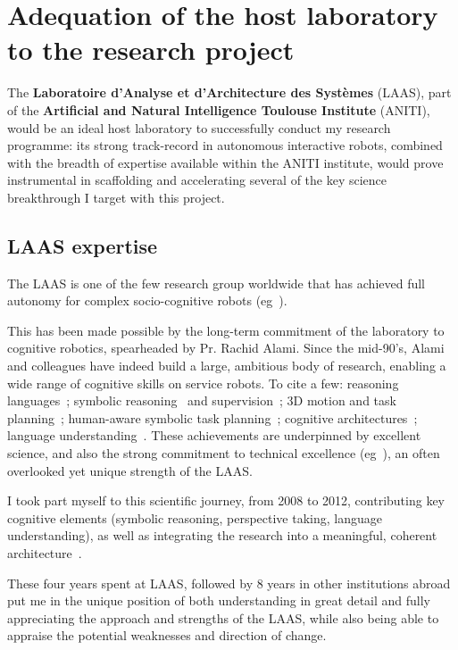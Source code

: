 \section{Adequation of the host laboratory to the research project}

The \textbf{Laboratoire d'Analyse et d'Architecture des Systèmes} (LAAS), part
of the \textbf{Artificial and Natural Intelligence Toulouse Institute} (ANITI), would
be an ideal host laboratory to successfully conduct my research programme: its
strong track-record in autonomous interactive robots, combined with the breadth
of expertise available within the ANITI institute, would prove instrumental in
scaffolding and accelerating several of the key science breakthrough I target
with this project.

\subsection{LAAS expertise}

The LAAS is one of the few research group worldwide that has achieved full
autonomy for complex socio-cognitive robots (eg~\cite{lemaignan2017artificial}).

This has been made possible by the long-term commitment of the laboratory to
cognitive robotics, spearheaded by Pr. Rachid Alami. Since the mid-90's, Alami
and colleagues have indeed build a large, ambitious body of research, enabling a
wide range of cognitive skills on service robots. To cite a few: reasoning
languages~\cite{Ingrand1996}; symbolic
reasoning~\cite{lemaignan2010oro} and supervision~\cite{Clodic2009}; 3D motion
and task planning~\cite{Sisbot2008, Mainprice2011}; human-aware symbolic task
planning~\cite{Alili2008,Lallement2014,milliez2016using}; cognitive
architectures~\cite{lemaignan2017artificial,devin2016implemented}; language
understanding~\cite{lemaignan2011grounding}.
These achievements are underpinned by excellent science, and also the strong
commitment to technical excellence (eg~\cite{mallet2010genom3}), an often
overlooked yet unique strength of the LAAS.


I took part myself to this scientific journey, from 2008 to 2012, contributing
key cognitive elements (symbolic reasoning, perspective taking, language
understanding), as well as integrating the research into a meaningful, coherent
architecture~\cite{lemaignan2017artificial}.

These four years spent at LAAS,
followed by 8 years in other institutions abroad put me in the unique position
of both understanding in great detail and fully appreciating the approach and
strengths of the LAAS, while also being able to appraise the potential
weaknesses and direction of change.

